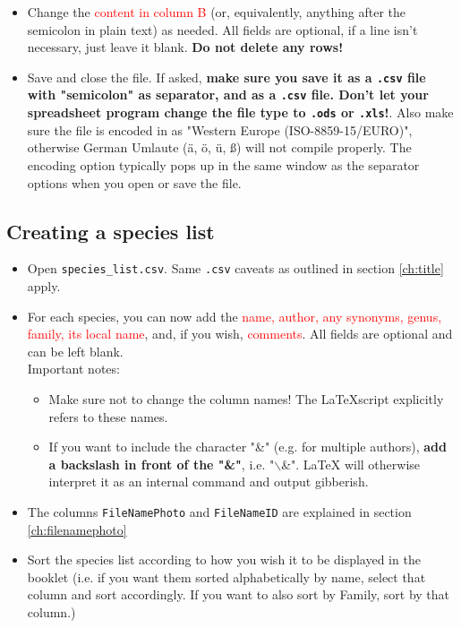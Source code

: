 \documentclass[a4paper,12pt,twoside]{article}
\begin{document}
\begin{itemize}
                \item Change the \textcolor{red}{content in column B} (or, equivalently, anything after the semicolon in plain text) as needed. All fields are optional, if a line isn't necessary, just leave it blank. \textbf{Do not delete any rows!}
                \item Save and close the file. If asked, \textbf{make sure you save it as a \texttt{.csv} file with "semicolon" as separator, and as a \texttt{.csv} file. Don't let your spreadsheet program change the file type to \texttt{.ods} or \texttt{.xls}!}. Also make sure the file is encoded in as "Western Europe (ISO-8859-15/EURO)", otherwise German Umlaute (ä, ö, ü, ß) will not compile properly. The encoding option typically pops up in the same window as the separator options when you open or save the file.
            \end{itemize}
            
        \newpage
        \subsection{Creating a species list}
            \begin{itemize}
                \item Open \texttt{species\_list.csv}. Same \texttt{.csv} caveats as outlined in section \ref{ch:title} apply.
                \item For each species, you can now add the \textcolor{red}{name, author, any synonyms, genus, family, its local name}, and, if you wish, \textcolor{red}{comments}. All fields are optional and can be left blank. \\Important notes: \begin{itemize}
                    \item Make sure not to change the column names! The \LaTeX script explicitly refers to these names.
                    \item If you want to include the character "\&" (e.g. for multiple authors), \textbf{add a backslash in front of the "\&"}, i.e. "$\backslash$\&". LaTeX will otherwise interpret it as an internal command and output gibberish.
                \end{itemize}
                \item The columns \texttt{FileNamePhoto} and \texttt{FileNameID} are explained in section \ref{ch:filenamephoto}
                \item Sort the species list according to how you wish it to be displayed in the booklet (i.e. if you want them sorted alphabetically by name, select that column and sort accordingly. If you want to also sort by Family, sort by that column.)
                \end{itemize}
                                          
\end{document}
